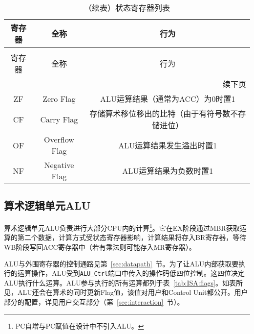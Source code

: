 \documentclass[lang=cn,a4paper,newtx]{elegantpaper}
\begin{document}
\begin{longtable}{c c c}
  \caption{状态寄存器列表} \label{tab:CPU:status} \\
  \toprule
  寄存器 & 全称 & 行为 \\ 
  \midrule
  \endfirsthead

  \caption[]{（续表）状态寄存器列表} \\
  \toprule
  寄存器 & 全称 & 行为\\
  \midrule
  \endhead

  \midrule
  \multicolumn{3}{r}{续下页} \\
  \midrule
  \endfoot

  \bottomrule
  \endlastfoot

  ZF   & Zero Flag             & ALU运算结果（通常为ACC）为0时置1\\
  CF  & Carry Flag     & 存储算术移位移出的比特（由于有符号数不存储进位）\\
  OF  & Overflow Flag &  ALU运算结果发生溢出时置1\\
  NF  & Negative Flag &  ALU运算结果为负数时置1\\
\end{longtable}
\subsection{算术逻辑单元ALU}
算术逻辑单元ALU负责进行大部分CPU内的计算\footnote{PC自增与PC赋值在设计中不引入ALU。}。它在EX阶段通过MBR获取运算的第二个数据，计算方式受状态寄存器影响，计算结果将存入BR寄存器，等待WB阶段写回ACC寄存器中（若有乘法则可能存入MR寄存器）。

ALU与外围寄存器的控制通路见第~\ref{sec:datapath}~节。为了让ALU内部获取要执行的运算操作，ALU受到\texttt{ALU\_Ctrl}端口中传入的操作码低四位控制。这四位决定ALU执行什么运算。ALU参与执行的所有运算都列于表~\ref{tab:ISA:flags}。如表所见，ALU还会在算术的同时更新Flag值，该值对用户和Control Unit都公开。用户部分的配置，详见用户交互部分（第~\ref{sec:interaction}~节）。
\end{document}

